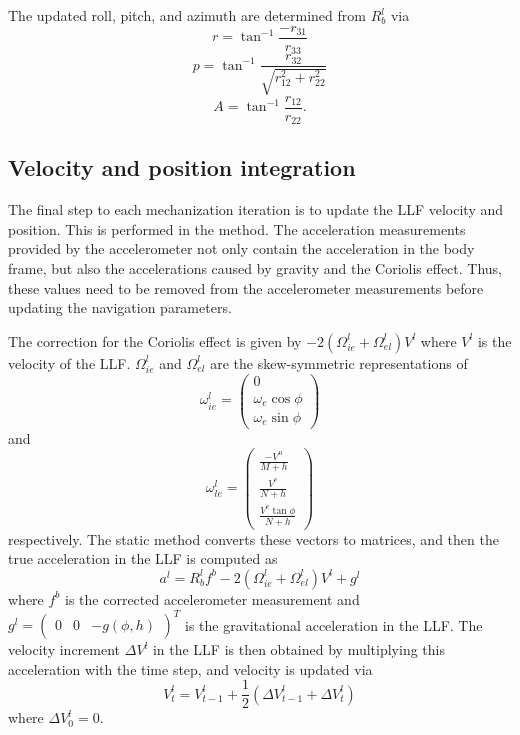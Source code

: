 \documentclass[11pt, oneside]{article}   	%
\begin{document}
The updated roll, pitch, and azimuth are determined from $R_b^l$ via 
\begin{equation}
r=\tan^{-1}\frac{-r_{31}}{r_{33}}
\end{equation}
\begin{equation}
p=\tan^{-1}\frac{r_{32}}{\sqrt{r_{12}^2+r_{22}^2}}
\end{equation}
\begin{equation}
A=\tan^{-1}\frac{r_{12}}{r_{22}}.
\end{equation}

\subsection{Velocity and position integration}
The final step to each mechanization iteration is to update the LLF velocity and position.  This is performed in the  method.  
The acceleration measurements provided by the accelerometer not only contain the acceleration in the body frame, but also the accelerations caused by gravity and the Coriolis effect. Thus, these values need to be removed from the accelerometer measurements before updating the navigation parameters.

The correction for the Coriolis effect is given by $-2(\Omega_{ie}^l+\Omega_{el}^l)V^l$ where $V^l$ is the velocity of the LLF.  $\Omega_{ie}^l$ and $\Omega_{el}^l$ are the skew-symmetric representations of 
\begin{equation}
\omega_{ie}^l=\begin{pmatrix}
0 \\
\omega_e\cos\phi \\
\omega_e\sin\phi
\end{pmatrix}
\end{equation}
and
\begin{equation}
\omega_{le}^l=\begin{pmatrix}
\frac{-V^n}{M+h} \\[.1cm]
\frac{V^e}{N+h} \\[.1cm]
\frac{V^e\tan\phi}{N+h}
\end{pmatrix}
\end{equation}
respectively.  The static method  converts these vectors to matrices, and then the true acceleration in the LLF is computed as
\begin{equation}
a^l=R_b^lf^b-2(\Omega_{ie}^l+\Omega_{el}^l)V^l+g^l
\end{equation}
where $f^b$ is the corrected accelerometer measurement and $g^l=\begin{pmatrix}0&0&-g(\phi, h)\end{pmatrix}^T$ is the gravitational acceleration in the LLF.  The velocity increment $\Delta V^l$ in the LLF is then obtained by multiplying this acceleration with the time step, and velocity is updated via
\begin{equation}
V^l_t=V^l_{t-1}+\frac12\left(\Delta V^l_{t-1}+\Delta V^l_t\right)
\end{equation}
where $\Delta V^l_0=0$.
\end{document}
